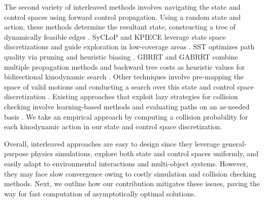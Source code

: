 The second variety of interleaved methods involves navigating the state and control spaces using forward control propagation. Using a random state and action, these methods determine the resultant state, constructing a tree of dynamically feasible edges \cite{pasricha2022pokerrt}.
SyCLoP and KPIECE leverage state space discretizations and guide exploration in low-coverage areas \cite{plaku2010motion,sucan2011sampling}.
SST optimizes path quality via pruning and heuristic biasing \cite{li2016asymptotically}.
GBRRT and GABRRT combine multiple propagation methods and backward tree costs as heuristic values for bidirectional kinodynamic search \cite{nayak2022bidirectional}. Other techniques involve pre-mapping the space of valid motions and conducting a search over this state and control space discretization \cite{shome2021asymptotically,bordalba2018randomized}.
Existing approaches that exploit lazy strategies for collision checking involve learning-based methods \cite{yu2021reducing} and evaluating paths on an as-needed basis \cite{kavraki2000path,mandalika2019generalized,hauser2015lazy}. We take an empirical approach by computing a collision probability for each kinodynamic action in our state and control space discretization.

Overall, interleaved approaches are easy to design since they leverage general-purpose physics simulations, explore both state and control spaces uniformly, and easily adapt to environmental interactions and multi-object systems. However, they may face slow convergence owing to costly simulation and collision checking methods. Next, we outline how our contribution mitigates these issues, paving the way for fast computation of asymptotically optimal solutions.
